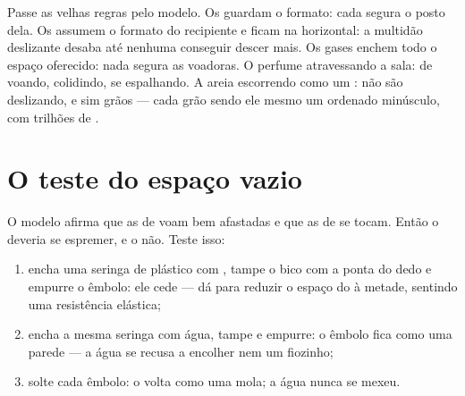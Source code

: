 \begin{example}\label{ex:g7:states-of-matter:rules}
Passe as velhas regras pelo modelo. Os  guardam o formato:
cada  segura o posto dela. Os  assumem o formato do
recipiente e ficam na horizontal: a multidão deslizante desaba até
nenhuma  conseguir descer mais. Os gases enchem todo o espaço
oferecido: nada segura as voadoras. O perfume atravessando a sala:
 de  voando, colidindo, se espalhando. A areia escorrendo
como um : não são  deslizando, e sim grãos --- cada
grão sendo ele mesmo um  ordenado minúsculo, com trilhões de
.
\end{example}

\section{O teste do espaço vazio}

\begin{method}\label{met:g7:states-of-matter:syringe}
O modelo afirma que as  de  voam bem afastadas e que as
de  se tocam. Então o  deveria se espremer, e o 
não. Teste isso:
\begin{enumerate}
  \item encha uma seringa de plástico com , tampe o bico com a
        ponta do dedo e empurre o êmbolo: ele cede --- dá para
        reduzir o espaço do  à metade, sentindo uma resistência
        elástica;
  \item encha a mesma seringa com água, tampe e empurre: o êmbolo
        fica como uma parede --- a água se recusa a encolher nem um
        fiozinho;
  \item solte cada êmbolo: o  volta como uma mola; a água nunca se
        mexeu.
\end{enumerate}
\end{method}

